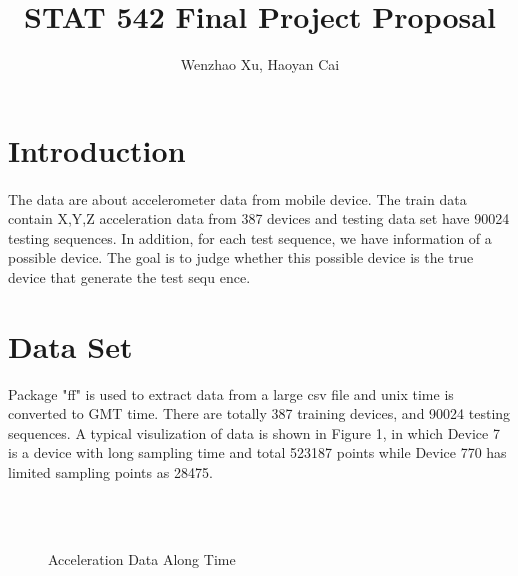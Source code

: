 \documentclass{article}
\author{Wenzhao Xu, Haoyan Cai}
\title{STAT 542 Final Project Proposal}
\begin{document}
	\maketitle
	
	\section{Introduction} %
	\label{sec:introduction}
	
	\paragraph{} The data are about accelerometer data from mobile device. The train data contain X,Y,Z acceleration data from 387 devices and testing data set have 90024 testing sequences. In addition, for each test sequence, we have information of a possible device. The goal is to judge whether this possible device is the true device that generate the test sequ ence. 
	
	
	\section{Data Set} %
	\label{sec:section_name}
	Package "ff" is used to extract data from a large csv file and unix time is converted to GMT time. There are totally 387 training devices, and 90024 testing sequences. A typical visulization of data is shown in Figure 1, in which Device 7 is a device with long sampling time and total 523187 points while Device 770 has limited sampling points as 28475.
	\begin{figure}
		\centering
		\\
		 \\
		\caption{Acceleration Data Along Time}
	\end{figure}
	
\end{document}
